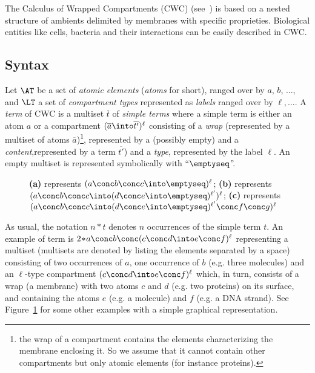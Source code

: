 \newcommand{\ov}[1]{\overline{#1}}
\newcommand{\srewRule}[3]{#1\srew{#3}#2}
\newcommand{\srew}[1]{\stackrel{#1}{\longmapsto}}
\newcommand{\csrew}[1]{\stackrel{#1}{\longmapsto}_{\sf c}}
\renewcommand{\wr}[3]{( #1 \into #2)^{#3}}


The Calculus of Wrapped Compartments (CWC)
(see~\cite{preQAPL2010,CDDGGT_TCSB11}) is based on a nested structure of ambients delimited by membranes with specific proprieties. Biological entities
like cells, bacteria and their interactions can be easily described in CWC.

\subsection{Syntax}
\label{CWC_formalism - syntax}

Let $\AT$ be a set of  \emph{atomic elements} (\emph{atoms} for
short), ranged over by $a$, $b$, ..., and  $\LT$ a set of \emph{compartment types} represented as \emph{labels} ranged over by $\ell,\ldots$.
A \emph{term} of CWC is a multiset $\ov{t}$ of  \emph{simple terms} where a simple term  is either an atom $a$ or a compartment $(\overline{a}\into
\overline{t'})^\ell$ consisting of a \emph{wrap}
 (represented by a multiset of atoms $\overline{a}$)\footnote{the wrap of a compartment contains the elements characterizing the membrane enclosing it. So we assume that it cannot contain other compartments but only atomic elements (for instance proteins).}, represented by a (possibly empty) and a \emph{content},represented by a term
$\overline{t'}$) and a \emph{type}, represented by the label $\ell$. An empty multiset is represented symbolically with ``$\emptyseq$''.

\begin{figure*}\centering
{}
\centering
{}

\caption{\textbf{(a)} represents $(a \conc b \conc c \into \emptyseq)^\ell$; \textbf{(b)} represents $(a \conc b \conc c  \into (d \conc e \into
\emptyseq)^{\ell'})^\ell$; \textbf{(c)} represents $(a \conc b \conc c \into (d \conc e \into \emptyseq)^{\ell'} \conc f \conc g)^\ell$}
\label{fig:example CWM}
\end{figure*}
As usual, the notation $n*t$ denotes $n$ occurrences of the simple term $t$. An example of term is $2\!*\!a \conc b \conc (c \conc d \into e \conc
f)^\ell$ representing a multiset (multisets are denoted by listing the elements separated by a space) consisting of two occurrences of $a$, one occurrence
of $b$ (e.g. three molecules) and an $\ell$-type compartment $(c \conc d \into e \conc f)^\ell$ which, in turn, consists of a wrap (a membrane) with two
atoms $c$ and $d$ (e.g. two proteins) on its surface, and containing the atoms $e$ (e.g. a molecule) and $f$ (e.g. a DNA strand). See
Figure~\ref{fig:example CWM} for some other examples with a simple graphical representation.



